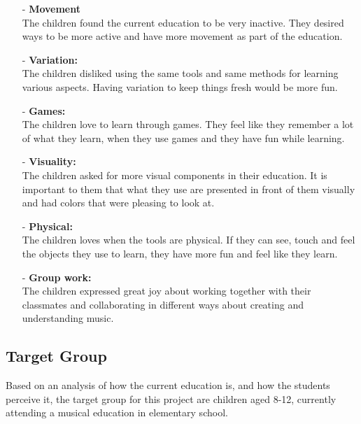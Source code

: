 \begin{itemize}
	\item[-] \textbf{Movement}\\
	The children found the current education to be very inactive. They desired ways to be more active and have more movement as part of the education.\\
	\item[-] \textbf{Variation:}\\
	The children disliked using the same tools and same methods for learning various aspects. Having variation to keep things fresh would be more fun.\\
	\item[-] \textbf{Games:}\\
	The children love to learn through games. They feel like they remember a lot of what they learn, when they use games and they have fun while learning. \\
	\item[-] \textbf{Visuality:}\\
	The children asked for more visual components in their education. It is important to them that what they use are presented in front of them visually and had colors that were pleasing to look at.\\
	\item[-] \textbf{Physical:}\\
	The children loves when the tools are physical. If they can see, touch and feel the objects they use to learn, they have more fun and feel like they learn.\\
	\item[-] \textbf{Group work:}\\
	The children expressed great joy about working together with their classmates and collaborating in different ways about creating and understanding music.\\
	
\end{itemize}



\subsection{Target Group} \label{sec:targetgroup} 
Based on an analysis of how the current education is, and how the students perceive it, the target group for this project are children aged 8-12, currently attending a musical education in elementary school.\\

